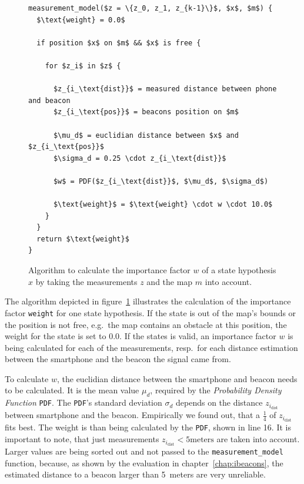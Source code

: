 \begin{figure}
\begin{lstlisting}[mathescape]
measurement_model($z = \{z_0, z_1, z_{k-1}\}$, $x$, $m$) {
  $\text{weight} = 0.0$
  
  if position $x$ on $m$ && $x$ is free {
    
    for $z_i$ in $z$ {
      
      $z_{i_\text{dist}}$ = measured distance between phone and beacon
      $z_{i_\text{pos}}$ = beacons position on $m$
    
      $\mu_d$ = euclidian distance between $x$ and $z_{i_\text{pos}}$
      $\sigma_d = 0.25 \cdot z_{i_\text{dist}}$
      
      $w$ = PDF($z_{i_\text{dist}}$, $\mu_d$, $\sigma_d$)
      
      $\text{weight}$ = $\text{weight} \cdot w \cdot 10.0$ 
    }
  }
  return $\text{weight}$
}
\end{lstlisting}
\caption{Algorithm to calculate the importance factor $w$ of a state hypothesis $x$ by taking the measurements $z$ and the map $m$ into account.}
\label{lst:mm_importancefactor}
\end{figure}

The algorithm depicted in figure~\ref{lst:mm_importancefactor} illustrates the calculation of the importance factor \texttt{weight} for one state hypothesis. If the state is out of the map's bounds or the position is not free, e.g.\ the map contains an obstacle at this position, the weight for the state is set to $0.0$. If the states is valid, an importance factor $w$ is being calculated for each of the measurements, resp.\ for each distance estimation between the smartphone and the beacon the signal came from.

To calculate $w$, the euclidian distance between the smartphone and beacon needs to be calculated. It is the mean value $\mu_d$, required by the \emph{Probability Density Function} \texttt{PDF}. The \texttt{PDF}'s standard deviation $\sigma_d$ depends on the distance $z_{i_\text{dist}}$ between smartphone and the beacon. Empirically we found out, that a $\frac{1}{4}$ of $z_{i_\text{dist}}$ fits best. The weight is than being calculated by the \texttt{PDF}, shown in line 16. It is important to note, that just measurements $z_{i_\text{dist}} < 5 \text{meters}$ are taken into account. Larger values are being sorted out and not passed to the \texttt{measurement\_model} function, because, as shown by the evaluation in chapter~\ref{chap:ibeacons}, the estimated distance to a beacon larger than 5~meters are very unreliable.

